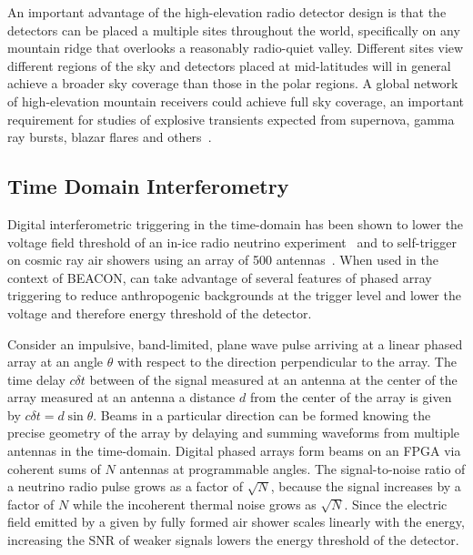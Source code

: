 \documentclass{PoS}
\begin{document}

An important advantage of the high-elevation radio detector design is that the detectors can be placed a multiple sites throughout the world, specifically on any mountain ridge that overlooks a reasonably radio-quiet valley. Different sites view different regions of the sky and detectors placed at mid-latitudes will in general achieve a broader sky coverage than those in the polar regions. A global network of high-elevation mountain receivers could achieve full sky coverage, an important requirement for studies of explosive transients expected from supernova, gamma ray bursts, blazar flares and others~\cite{astro_decadal}.

\subsection{Time Domain Interferometry} 

Digital interferometric triggering in the time-domain has been shown to lower the voltage field threshold of an in-ice radio neutrino experiment~\cite{oberla_ara_pa} and to self-trigger on cosmic ray air showers using an array of 500 antennas~\cite{ryan_monroe}. When used in the context of BEACON, can take advantage of several features of phased array triggering to reduce anthropogenic backgrounds at the trigger level and lower the voltage and therefore energy threshold of the detector.

Consider an impulsive, band-limited, plane wave pulse arriving at a linear phased array at an angle $\theta$ with respect to the direction perpendicular to the array. The time delay $c \delta t$ between of the signal measured at an antenna at the center of the array measured at an antenna a distance $d$ from the center of the array is given by $c \delta t = d \sin \theta$. Beams in a particular direction can be formed knowing the precise geometry of the array by delaying and summing waveforms from multiple antennas in the time-domain. Digital phased arrays form beams on an FPGA via coherent sums of $N$ antennas at programmable angles. The signal-to-noise ratio of a neutrino radio pulse grows as a factor of $\sqrt{N}$, because the signal increases by a factor of $N$ while the incoherent thermal noise grows as $\sqrt{N}$. Since the electric field emitted by a given by fully formed air shower scales linearly with the energy, increasing the SNR of weaker signals lowers the energy threshold of the detector. 
\end{document}
